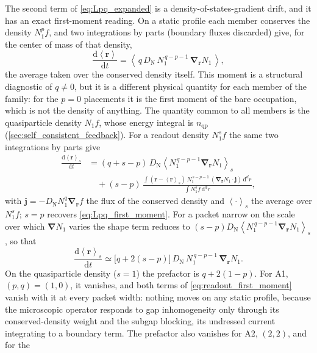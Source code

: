 \documentclass[
  aps,
  prb,
  preprint,
  superscriptaddress,
  longbibliography,
  nofootinbib
]{revtex4-2}
\newcommand{\dd}{\mathrm{d}}
\newcommand{\avg}[1]{\left\langle #1 \right\rangle}
\newcommand{\br}{\mathbf{r}}
\newcommand{\bnabla}{\boldsymbol{\nabla}}
\newcommand{\DOS}{N_1}
\newcommand{\DN}{D_{\mathrm{N}}}
\newcommand{\qp}{\mathrm{qp}}
\begin{document}
The second term of \cref{eq:Lpq_expanded} is a
density-of-states-gradient drift, and it has an exact first-moment
reading. On a static profile each member conserves the density
\(\DOS^{p}f\), and two integrations by parts (boundary fluxes
discarded) give, for the center of mass of that density,
\begin{equation}
  \frac{\dd\avg{\br}}{\dd t}
  =
  \avg{\,q\,\DN\,\DOS^{\,q-p-1}\,\bnabla_{\br}\DOS\,},
  \label{eq:Lpq_first_moment}
\end{equation}
the average taken over the conserved density itself. This moment is a
structural diagnostic of \(q\neq0\), but it is a different physical
quantity for each member of the family: for the \(p=0\) placements it is
the first moment of the bare occupation, which is not the density of
anything. The quantity common to all members is the quasiparticle
density \(\DOS f\), whose energy integral is \(n_{\qp}\)
(\cref{sec:self_consistent_feedback}). For a readout density
\(\DOS^{s}f\) the same two integrations by parts give
\begin{equation}
  \begin{split}
  \frac{\dd\avg{\br}_{s}}{\dd t}
  &=
  (q+s-p)\,\DN\avg{\DOS^{\,q-p-1}\bnabla_{\br}\DOS}_{s}
  \\
  &\quad
  +(s-p)\,
  \frac{\int(\br-\avg{\br}_{s})\,\DOS^{\,s-p-1}\,
        (\bnabla_{\br}\DOS\cdot\mathbf j)\,\dd^{d}r}
       {\int\DOS^{s}f\,\dd^{d}r},
  \end{split}
  \label{eq:readout_first_moment}
\end{equation}
with \(\mathbf j=-\DN\DOS^{q}\bnabla_{\br}f\) the flux of the conserved
density and \(\avg{\cdot}_{s}\) the average over \(\DOS^{s}f\); \(s=p\)
recovers \cref{eq:Lpq_first_moment}. For a packet narrow on the scale
over which \(\bnabla\DOS\) varies the shape term reduces to
\((s-p)\DN\avg{\DOS^{\,q-p-1}\bnabla_{\br}\DOS}_{s}\), so that
\begin{equation}
  \frac{\dd\avg{\br}_{s}}{\dd t}
  \simeq
  \bigl[q+2(s-p)\bigr]\,\DN\,\DOS^{\,q-p-1}\,\bnabla_{\br}\DOS .
  \label{eq:readout_drift_narrow}
\end{equation}
On the quasiparticle density (\(s=1\)) the prefactor is \(q+2(1-p)\).
For A1, \((p,q)=(1,0)\), it vanishes, and both terms of
\cref{eq:readout_first_moment} vanish with it at every packet width:
nothing moves on any static profile, because the microscopic operator
responds to gap inhomogeneity only through its conserved-density weight
and the subgap blocking, its undressed current integrating to a boundary
term. The prefactor also vanishes for A2, \((2,2)\), and for the
\end{document}
